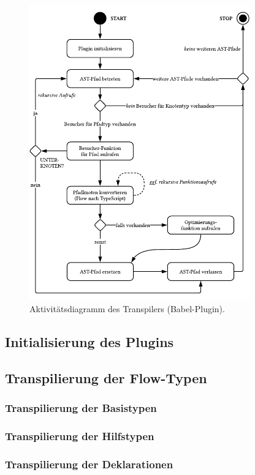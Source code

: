 \begin{figure}[tbp]
  \centering
  \includegraphics[width=0.85\textwidth]{src/4_Umsetzung/fig/activity-diagram-plugin.pdf}
  \caption{Aktivitätsdiagramm des Transpilers (Babel-Plugin).}
  \label{fig:activity-diagram-plugin}
\end{figure}

\subsection{Initialisierung des Plugins}
\subsection{Transpilierung der Flow-Typen}
  \subsubsection{Transpilierung der Basistypen}
  \subsubsection{Transpilierung der Hilfstypen}
  \subsubsection{Transpilierung der Deklarationen}

